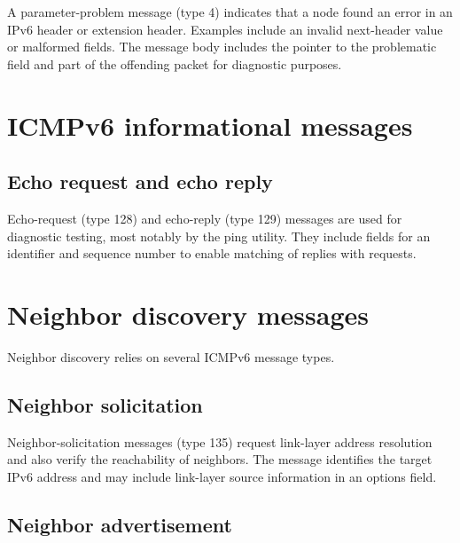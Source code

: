 A parameter-problem message (type 4) indicates that a node found an error in an IPv6 header or extension header. Examples include an invalid next-header value or malformed fields. The message body includes the pointer to the problematic field and part of the offending packet for diagnostic purposes.

\section{ICMPv6 informational messages}

\subsection{Echo request and echo reply}

Echo-request (type 128) and echo-reply (type 129) messages are used for diagnostic testing, most notably by the ping utility. They include fields for an identifier and sequence number to enable matching of replies with requests.

\begin{center}
\end{center}

\section{Neighbor discovery messages}

Neighbor discovery relies on several ICMPv6 message types.

\subsection{Neighbor solicitation}

Neighbor-solicitation messages (type 135) request link-layer address resolution and also verify the reachability of neighbors. The message identifies the target IPv6 address and may include link-layer source information in an options field.

\begin{center}
\end{center}

\subsection{Neighbor advertisement}

